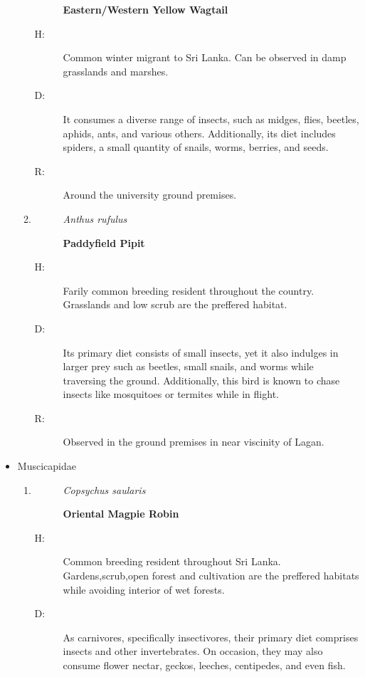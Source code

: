 \begin{itemize}
\begin{enumerate}
\begin{description}
\textbf{Eastern/Western Yellow Wagtail}%
\end{description}%
\begin{description}%
\item[H: ]%
Common winter migrant to Sri Lanka. Can be observed in damp grasslands and marshes.%
\item[D: ]%
It consumes a diverse range of insects, such as midges, flies, beetles, aphids, ants, and various others. Additionally, its diet includes spiders, a small quantity of snails, worms, berries, and seeds.%
\item[R: ]%
Around the university ground premises.%
\end{description}%
\item%
\begin{description}%
\item[]%
\textit{Anthus rufulus}%
\item[]%
\textbf{Paddyfield Pipit}%
\end{description}%
\begin{description}%
\item[H: ]%
Farily common breeding resident throughout the country. Grasslands and low scrub are the preffered habitat.%
\item[D: ]%
Its primary diet consists of small insects, yet it also indulges in larger prey such as beetles, small snails, and worms while traversing the ground. Additionally, this bird is known to chase insects like mosquitoes or termites while in flight.%
\item[R: ]%
Observed in the ground premises in near viscinity of Lagan.%
\end{description}%
\end{enumerate}%
\item%
Muscicapidae%
\begin{enumerate}%
\item%
\begin{description}%
\item[]%
\textit{Copsychus saularis}%
\item[]%
\textbf{Oriental Magpie Robin}%
\end{description}%
\begin{description}%
\item[H: ]%
Common breeding resident throughout Sri Lanka. Gardens,scrub,open forest and cultivation are the preffered habitats while avoiding interior of wet forests.%
\item[D: ]%
As carnivores, specifically insectivores, their primary diet comprises insects and other invertebrates. On occasion, they may also consume flower nectar, geckos, leeches, centipedes, and even fish.%

\end{description}
\end{enumerate}
\end{itemize}
